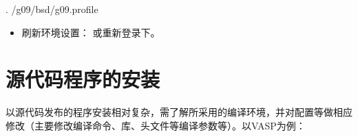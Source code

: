 \documentclass[a4paper,12pt,english]{sphinxmanual}
\begin{document}
\begin{sphinxVerbatim}[commandchars=\\\{\}]
 
 
. /g09/bsd/g09.profile
\end{sphinxVerbatim}
\begin{itemize}
\item {} 
\sphinxAtStartPar
刷新环境设置：   或重新登录下。

\end{itemize}


\section{源代码程序的安装}
\label{\detokenize{compile-install/compile-install:id6}}
\sphinxAtStartPar
以源代码发布的程序安装相对复杂，需了解所采用的编译环境，并对配置等做相应修改（主要修改编译命令、库、头文件等编译参数等）。以VASP为例：
\end{document}
